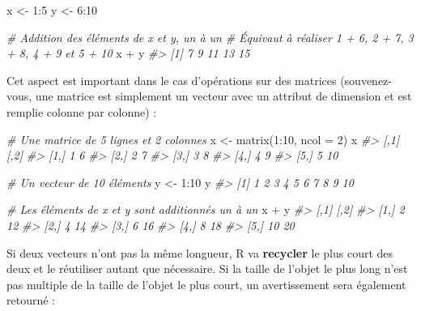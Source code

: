\documentclass[
  french,
]{scrbook}
\newenvironment{Shaded}{\begin{snugshade}}{\end{snugshade}}
\newcommand{\AttributeTok}[1]{\textcolor[rgb]{0.77,0.63,0.00}{#1}}
\newcommand{\CommentTok}[1]{\textcolor[rgb]{0.56,0.35,0.01}{\textit{#1}}}
\newcommand{\DecValTok}[1]{\textcolor[rgb]{0.00,0.00,0.81}{#1}}
\newcommand{\FunctionTok}[1]{\textcolor[rgb]{0.00,0.00,0.00}{#1}}
\newcommand{\NormalTok}[1]{#1}
\newcommand{\OtherTok}[1]{\textcolor[rgb]{0.56,0.35,0.01}{#1}}
\newcommand{\SpecialCharTok}[1]{\textcolor[rgb]{0.00,0.00,0.00}{#1}}
\begin{document}
\begin{Shaded}
\begin{Highlighting}[]
\NormalTok{x }\OtherTok{\textless{}{-}} \DecValTok{1}\SpecialCharTok{:}\DecValTok{5}
\NormalTok{y }\OtherTok{\textless{}{-}} \DecValTok{6}\SpecialCharTok{:}\DecValTok{10}

\CommentTok{\# Addition des éléments de x et y, un à un}
\CommentTok{\# Équivaut à réaliser 1 + 6, 2 + 7, 3 + 8, 4 + 9 et 5 + 10}
\NormalTok{x }\SpecialCharTok{+}\NormalTok{ y}
\CommentTok{\#\textgreater{} [1]  7  9 11 13 15}
\end{Highlighting}
\end{Shaded}

Cet aspect est important dans le cas d'opérations sur des matrices (souvenez-vous, une matrice est simplement un vecteur avec un attribut de dimension et est remplie colonne par colonne) :

\begin{Shaded}
\begin{Highlighting}[]
\CommentTok{\# Une matrice de 5 lignes et 2 colonnes}
\NormalTok{x }\OtherTok{\textless{}{-}} \FunctionTok{matrix}\NormalTok{(}\DecValTok{1}\SpecialCharTok{:}\DecValTok{10}\NormalTok{, }\AttributeTok{ncol =} \DecValTok{2}\NormalTok{)}
\NormalTok{x}
\CommentTok{\#\textgreater{}      [,1] [,2]}
\CommentTok{\#\textgreater{} [1,]    1    6}
\CommentTok{\#\textgreater{} [2,]    2    7}
\CommentTok{\#\textgreater{} [3,]    3    8}
\CommentTok{\#\textgreater{} [4,]    4    9}
\CommentTok{\#\textgreater{} [5,]    5   10}

\CommentTok{\# Un vecteur de 10 éléments}
\NormalTok{y }\OtherTok{\textless{}{-}} \DecValTok{1}\SpecialCharTok{:}\DecValTok{10}
\NormalTok{y}
\CommentTok{\#\textgreater{}  [1]  1  2  3  4  5  6  7  8  9 10}

\CommentTok{\# Les éléments de x et y sont additionnés un à un}
\NormalTok{x }\SpecialCharTok{+}\NormalTok{ y}
\CommentTok{\#\textgreater{}      [,1] [,2]}
\CommentTok{\#\textgreater{} [1,]    2   12}
\CommentTok{\#\textgreater{} [2,]    4   14}
\CommentTok{\#\textgreater{} [3,]    6   16}
\CommentTok{\#\textgreater{} [4,]    8   18}
\CommentTok{\#\textgreater{} [5,]   10   20}
\end{Highlighting}
\end{Shaded}

Si deux vecteurs n'ont pas la même longueur, R va \textbf{recycler} le plus court des deux et le réutiliser autant que nécessaire. Si la taille de l'objet le plus long n'est pas multiple de la taille de l'objet le plus court, un avertissement sera également retourné :
\end{document}
